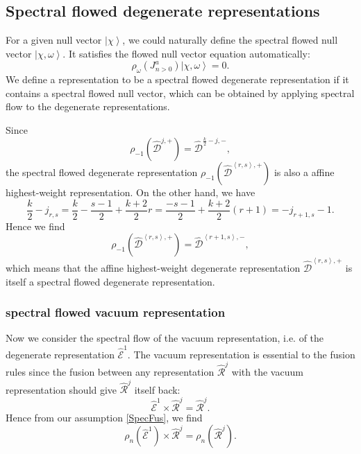 \documentclass[10pt,a4paper]{article}
\numberwithin{equation}{section}
\newcommand{\ket}[1]{\left| #1 \right\rangle}
\newcommand{\vev}[1]{\left\langle #1 \right\rangle}
\begin{document}
\subsection{Spectral flowed degenerate representations}

For a given null vector $\ket{\chi}$, we could naturally define the spectral flowed null vector $\ket{\chi,\omega}$. 
It satisfies the flowed null vector equation automatically:
\begin{equation}
    \rho_{\omega} \left(J^{a}_{n>0}\right) \ket{\chi,\omega} = 0.
\end{equation}
We define a representation to be a spectral flowed degenerate representation if it contains a spectral flowed null vector, which can 
be obtained by applying spectral flow to the degenerate representations.

Since 
\begin{equation}
    \rho_{-1} \left( \widehat{\mathcal{D}}^{j,+} \right) = \widehat{\mathcal{D}}^{\frac{k}{2}-j,-},
\end{equation}
the spectral flowed degenerate representation $\rho_{-1} \left( \widehat{\mathcal{D}}^{\vev{r,s},+} \right)$ is also a affine highest-weight 
representation. On the other hand, we have 
\begin{equation}
    \frac{k}{2} - j_{r,s} = \frac{k}{2} - \frac{s-1}{2} + \frac{k+2}{2} r = \frac{-s-1}{2} + \frac{k+2}{2}(r+1) = -j_{r+1,s}-1.
\end{equation}
Hence we find 
\begin{equation}
    \rho_{-1} \left( \widehat{\mathcal{D}}^{\vev{r,s},+} \right) = \widehat{\mathcal{D}}^{\vev{r+1,s},-},
\end{equation}
which means that the affine highest-weight degenerate representation $\widehat{\mathcal{D}}^{\vev{r,s},+}$ is itself a spectral flowed 
degenerate representation. 

\subsubsection*{spectral flowed vacuum representation} 
Now we consider the spectral flow of the vacuum representation, i.e. of the degenerate representation $\hat{\mathcal{E}}^{1}$. The vacuum 
representation is essential to the fusion rules since the fusion between any representation $\hat{\mathcal{R}}^{j}$ with 
the vacuum representation should give $\hat{\mathcal{R}}^{j}$ itself back: 
\begin{equation}
    \hat{\mathcal{E}}^{1} \times \hat{\mathcal{R}}^{j} = \hat{\mathcal{R}}^{j}.
\end{equation}
Hence from our assumption \eqref{SpecFus}, we find 
\begin{equation}
    \rho_{n} \left( \hat{\mathcal{E}}^{1} \right) \times \hat{\mathcal{R}}^{j} = \rho_{n} \left( \hat{\mathcal{R}}^{j} \right).
\end{equation}
\end{document}
